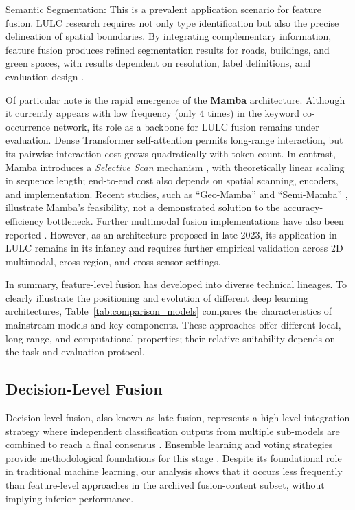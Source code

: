 \documentclass[]{interact}
\theoremstyle{plain}%
\theoremstyle{definition}
\theoremstyle{remark}
\begin{document}
\medskip
Semantic Segmentation: This is a prevalent application scenario for feature fusion. LULC research requires not only type identification but also the precise delineation of spatial boundaries. By integrating complementary information, feature fusion produces refined segmentation results for roads, buildings, and green spaces, with results dependent on resolution, label definitions, and evaluation design \citep{45, 48}.

Of particular note is the rapid emergence of the \textbf{Mamba} architecture. Although it currently appears with low frequency (only 4 times) in the keyword co-occurrence network, its role as a backbone for LULC fusion remains under evaluation. Dense Transformer self-attention permits long-range interaction, but its pairwise interaction cost grows quadratically with token count. In contrast, Mamba introduces a \textit{Selective Scan} mechanism \citep{53}, with theoretically linear scaling in sequence length; end-to-end cost also depends on spatial scanning, encoders, and implementation. Recent studies, such as ``Geo-Mamba'' \citep{49} and ``Semi-Mamba'' \citep{51}, illustrate Mamba's feasibility, not a demonstrated solution to the accuracy-efficiency bottleneck. Further multimodal fusion implementations have also been reported \citep{5,52}. However, as an architecture proposed in late 2023, its application in LULC remains in its infancy and requires further empirical validation across 2D multimodal, cross-region, and cross-sensor settings.

In summary, feature-level fusion has developed into diverse technical lineages. To clearly illustrate the positioning and evolution of different deep learning architectures, Table~\ref{tab:comparison_models} compares the characteristics of mainstream models and key components. These approaches offer different local, long-range, and computational properties; their relative suitability depends on the task and evaluation protocol.


\subsection{Decision-Level Fusion}
Decision-level fusion, also known as late fusion, represents a high-level integration strategy where independent classification outputs from multiple sub-models are combined to reach a final consensus \citep{55}. Ensemble learning and voting strategies provide methodological foundations for this stage \citep{55}. Despite its foundational role in traditional machine learning, our analysis shows that it occurs less frequently than feature-level approaches in the archived fusion-content subset, without implying inferior performance.
\end{document}
